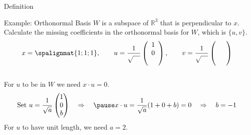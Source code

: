 \begin{frame}{Definition}
    \begin{center}\end{center}
\end{frame}




\begin{frame}{Example: Orthonormal Basis}  
    \vspace{-6pt}
    $ W $ is a subspace of $ \mathbb R ^{3}$ that is perpendicular to $x$.  Calculate the missing coefficients in the orthonormal basis for $W$, which is $\{u, v\}$. 
    \begin{equation*}
    x = \spalignmat{1;1;1}, \qquad 
    u = 
    \frac{1}{\sqrt{\quad}}
    \begin{pmatrix}
        1 \\ 0 \\ \phantom {\int\int} 
    \end{pmatrix} ,
    \qquad 
    v= 
    \frac{1}{\sqrt{\quad}}
    \begin{pmatrix}
        \phantom {\int\int}  \\ \phantom {\int\int}  \\ \phantom {\int\int} 
    \end{pmatrix} 
    \end{equation*}
    \\    
    \pause For $u$ to be in $W$ we need $x\cdot u =0$. \pause 
    $$\text{Set } u=\frac{1}{\sqrt a}\begin{pmatrix} 1\\0\\b \end{pmatrix} \quad \Rightarrow \quad \pause x\cdot u = \frac{1}{\sqrt{a}}(1+0+b)=0 \quad \Rightarrow \quad b = -1$$
    \pause For $u$ to have unit length, we need $a=2$. 
\end{frame}



